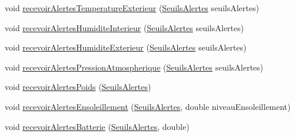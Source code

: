 \begin{DoxyCompactItemize}
\item 
void \hyperlink{class_ruche_af09b04e9a415ad3df9941068b74046fc}{recevoir\+Alertes\+Temperature\+Exterieur} (\hyperlink{parametres_8h_aaa6de8207c94675264c90b10b613368d}{Seuils\+Alertes} seuils\+Alertes)
\item 
void \hyperlink{class_ruche_af7b500ef1469f689dfe6b78ae6e3c025}{recevoir\+Alertes\+Humidite\+Interieur} (\hyperlink{parametres_8h_aaa6de8207c94675264c90b10b613368d}{Seuils\+Alertes} seuils\+Alertes)
\item 
void \hyperlink{class_ruche_a6b12ebe7e83f12b31e49b44e25fdfa58}{recevoir\+Alertes\+Humidite\+Exterieur} (\hyperlink{parametres_8h_aaa6de8207c94675264c90b10b613368d}{Seuils\+Alertes} seuils\+Alertes)
\item 
void \hyperlink{class_ruche_aa649f21e5d2a196bc7fbc570dc731ade}{recevoir\+Alertes\+Pression\+Atmospherique} (\hyperlink{parametres_8h_aaa6de8207c94675264c90b10b613368d}{Seuils\+Alertes} seuils\+Alertes)
\item 
void \hyperlink{class_ruche_aa5dc6e5c65d0a685dcaa1c698b25e938}{recevoir\+Alertes\+Poids} (\hyperlink{parametres_8h_aaa6de8207c94675264c90b10b613368d}{Seuils\+Alertes})
\item 
void \hyperlink{class_ruche_afdfb0cff676b6de5f421aed01c3d49db}{recevoir\+Alertes\+Ensoleillement} (\hyperlink{parametres_8h_aaa6de8207c94675264c90b10b613368d}{Seuils\+Alertes}, double niveau\+Ensoleillement)
\item 
void \hyperlink{class_ruche_aee278a316c2e462e43705e15a36ab43f}{recevoir\+Alertes\+Batterie} (\hyperlink{parametres_8h_aaa6de8207c94675264c90b10b613368d}{Seuils\+Alertes}, double)
\end{DoxyCompactItemize}
